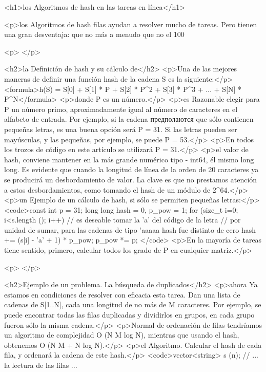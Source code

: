 <h1>los Algoritmos de hash en las tareas en línea</h1>

<p>los Algoritmos de hash filas ayudan a resolver mucho de tareas. Pero tienen una gran desventaja: que no más a menudo que no el 100%

<p> </p>

<h2>la Definición de hash y su cálculo de</h2>
<p>Una de las mejores maneras de definir una función hash de la cadena S es la siguiente:</p>
<formula>h(S) = S[0] + S[1] * P + S[2] * P^2 + S[3] * P^3 + ... + S[N] * P^N</formula>
<p>donde P es un número.</p>
<p>es Razonable elegir para P un número primo, aproximadamente igual al número de caracteres en el alfabeto de entrada. Por ejemplo, si la cadena предполаются que sólo contienen pequeñas letras, es una buena opción será P = 31. Si las letras pueden ser mayúsculas, y las pequeñas, por ejemplo, se puede P = 53.</p>
<p>En todos los trozos de código en este artículo se utilizará P = 31.</p>
<p>el valor de hash, conviene mantener en la más grande numérico tipo - int64, él mismo long long. Es evidente que cuando la longitud de línea de la orden de 20 caracteres ya se producirá un desbordamiento de valor. La clave es que no prestamos atención a estos desbordamientos, como tomando el hash de un módulo de 2^64.</p>
<p>un Ejemplo de un cálculo de hash, si sólo se permiten pequeñas letras:</p>
<code>const int p = 31;
long long hash = 0, p_pow = 1;
for (size_t i=0; i<s.length (); i++)
{
// es deseable tomar la 'a' del código de la letra
// por unidad de sumar, para las cadenas de tipo 'aaaaa hash fue distinto de cero
hash += (s[i] - 'a' + 1) * p_pow;
p_pow *= p;
}</code>
<p>En la mayoría de tareas tiene sentido, primero, calcular todos los grado de P en cualquier matriz.</p>

<p> </p>

<h2>Ejemplo de un problema. La búsqueda de duplicados</h2>
<p>ahora Ya estamos en condiciones de resolver con eficacia esta tarea. Dan una lista de cadenas de S[1..N], cada una longitud de no más de M caracteres. Por ejemplo, se puede encontrar todas las filas duplicadas y dividirlos en grupos, en cada grupo fueron sólo la misma cadena.</p>
<p>Normal de ordenación de filas tendríamos un algoritmo de complejidad O (N M log N), mientras que usando el hash, obtenemos O (N M + N log N).</p>
<p>el Algoritmo. Calcular el hash de cada fila, y ordenará la cadena de este hash.</p>
<code>vector<string> s (n);
// ... la lectura de las filas ...

